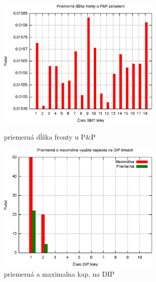 \documentclass[12pt,a4paper,titlepage,final]{article}
\begin{document}
\begin{figure}[!h]
  \centering
  \begin{minipage}{0.45\linewidth}
  \centering
  \includegraphics[width=8cm]{doc/2_hist3.eps}
  \caption{priemerná dĺžka fronty u P\&P}
  \end{minipage}
  \quad
  \begin{minipage}{0.45\linewidth}
    \centering
    \includegraphics[width=8cm]{doc/2_hist4.eps}
    \caption{priemerná a maximalna kap. na DIP}
  \end{minipage}
\end{figure}
\end{document}
